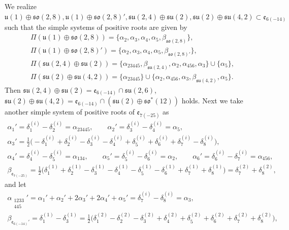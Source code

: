 \documentclass[pdftex]{sigma}
\numberwithin{equation}{section}
\begin{document}
We realize $\mathfrak{u}(1)\oplus\mathfrak{so}(2,8),\mathfrak{u}(1)\oplus\mathfrak{so}(2,8)',
\mathfrak{su}(2,4)\oplus\mathfrak{su}(2),\mathfrak{su}(2)\oplus\mathfrak{su}(4,2)\subset\mathfrak{e}_{6(-14)}$ such that
the simple systems of positive roots are given by
\begin{gather*}
\Pi(\mathfrak{u}(1)\oplus\mathfrak{so}(2,8)) =\{\alpha_2,\alpha_3,\alpha_4,\alpha_5,\beta_{\mathfrak{so}(2,8)}\},\\
\Pi(\mathfrak{u}(1)\oplus\mathfrak{so}(2,8)') =\{\alpha_2,\alpha_3,\alpha_4,\alpha_5,\beta_{\mathfrak{so}(2,8)'}\},\\
\Pi(\mathfrak{su}(2,4)\oplus\mathfrak{su}(2)) =\{\alpha_{23445},\beta_{\mathfrak{su}(2,4)},\alpha_2,\alpha_{456},\alpha_3\}\cup\{\alpha_5\},\\
\Pi(\mathfrak{su}(2)\oplus\mathfrak{su}(4,2)) =\{\alpha_{23445}\}\cup\{\alpha_2,\alpha_{456},\alpha_3,\beta_{\mathfrak{su}(4,2)},\alpha_5\}.
\end{gather*}
Then $\mathfrak{su}(2,4)\oplus\mathfrak{su}(2)=\mathfrak{e}_{6(-14)}\cap\mathfrak{su}(2,6)$,
$\mathfrak{su}(2)\oplus\mathfrak{su}(4,2)=\mathfrak{e}_{6(-14)}\cap(\mathfrak{su}(2)\oplus\mathfrak{so}^*(12))$ holds.
Next we take another simple system of positive roots of $\mathfrak{e}_{7(-25)}$ as
\begin{gather*}
\alpha_1' =\delta_1^{(i)}-\delta_2^{(i)}=\alpha_{23445},\qquad
\alpha_2' =\delta_3^{(i)}-\delta_4^{(i)}=\alpha_5,\\
\alpha_3' =\tfrac{1}{2}\big({-}\delta_1^{(i)}+\delta_2^{(i)}-\delta_3^{(i)}-\delta_4^{(i)}+\delta_5^{(i)}+\delta_6^{(i)}+\delta_7^{(i)}
-\delta_8^{(i)}\big),\\
\alpha_4' =\delta_4^{(i)}-\delta_5^{(i)}=\alpha_{134},\qquad
\alpha_5' =\delta_5^{(i)}-\delta_6^{(i)}=\alpha_2,\qquad
\alpha_6' =\delta_6^{(i)}-\delta_7^{(i)}=\alpha_{456},\\
\beta_{\mathfrak{e}_{7(-25)}}
 =\tfrac{1}{2}\big(\delta_1^{(1)}+\delta_2^{(1)}-\delta_3^{(1)}-\delta_4^{(1)}-\delta_5^{(1)}-\delta_6^{(1)}+\delta_7^{(1)}+\delta_8^{(1)}\big)
=\delta_7^{(2)}+\delta_8^{(2)},
\end{gather*}
and let
\begin{gather*}
\alpha_{\substack{1233\\445}}' =\alpha_1'+\alpha_2'+2\alpha_3'+2\alpha_4'+\alpha_5'=\delta_7^{(i)}-\delta_8^{(i)}=\alpha_3,\\
\beta_{\mathfrak{e}_{6(-14)}'} =\delta_1^{(1)}-\delta_3^{(1)}
=\tfrac{1}{2}\big(\delta_1^{(2)}-\delta_2^{(2)}-\delta_3^{(2)}+\delta_4^{(2)}+\delta_5^{(2)}+\delta_6^{(2)}+\delta_7^{(2)}+\delta_8^{(2)}\big),
\end{gather*}
\end{document}
